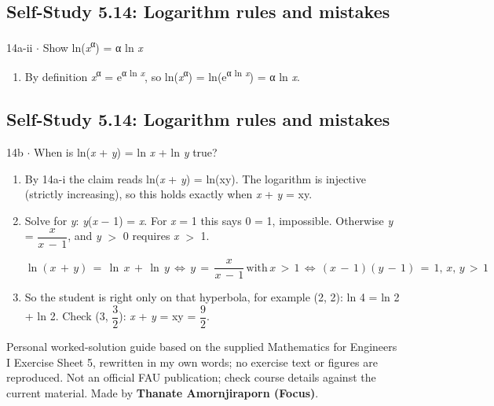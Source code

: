 \documentclass[11pt]{article}
\begin{document}
\begin{keepsection}\subsection{Self-Study 5.14: Logarithm rules and mistakes}

\begin{workedbox}{14a-ii \ensuremath{\cdot} Show ln(\textit{x}\textsuperscript{α}) = α ln \textit{x}}
\begin{enumerate}
\item By definition \textit{x}\textsuperscript{α} = e\textsuperscript{α ln \textit{x}}, so ln(\textit{x}\textsuperscript{α}) = ln(e\textsuperscript{α ln \textit{x}}) = α ln \textit{x}.
\end{enumerate}
\end{workedbox}

\end{keepsection}
\begin{keepsection}\subsection{Self-Study 5.14: Logarithm rules and mistakes}

\begin{workedbox}{14b \ensuremath{\cdot} When is ln(\textit{x} + \textit{y}) = ln \textit{x} + ln \textit{y} true?}
\begin{enumerate}
\item By 14a-i the claim reads ln(\textit{x} + \textit{y}) = ln(xy). The logarithm is injective (strictly increasing), so this holds exactly when \textit{x} + \textit{y} = xy.
\item {}
Solve for \textit{y}: \textit{y}(\textit{x} \ensuremath{-} 1) = \textit{x}. For \textit{x} = 1 this says 0 = 1, impossible. Otherwise \textit{y} = {\small\ensuremath{\dfrac{{x}}{{x}\, -\, 1}}}, and \textit{y} \ensuremath{>} 0 requires \textit{x} \ensuremath{>} 1.

\begin{equation*}\ln ({x}\, +\, {y})\, =\, \ln \, {x}\, +\, \ln \, {y}\, \Leftrightarrow \, {y}\, =\, \dfrac{{x}}{{x}\, -\, 1}\, \text{with}\, {x}\, >\, 1\, \Leftrightarrow \, ({x}\, -\, 1)({y}\, -\, 1)\, =\, 1,\, {x},\, {y}\, >\, 1\end{equation*}
\item So the student is right only on that hyperbola, for example (2, 2): ln 4 = ln 2 + ln 2. Check (3, {\small\ensuremath{\dfrac{3}{2}}}): \textit{x} + \textit{y} = xy = {\small\ensuremath{\dfrac{9}{2}}}.
\end{enumerate}
\end{workedbox}

\end{keepsection}

\vfill{\small Personal worked-solution guide based on the supplied Mathematics for Engineers I Exercise Sheet 5, rewritten in my own words; no exercise text or figures are reproduced. Not an official FAU publication; check course details against the current material. Made by \textbf{Thanate Amornjiraporn (Focus)}.}
\end{document}
